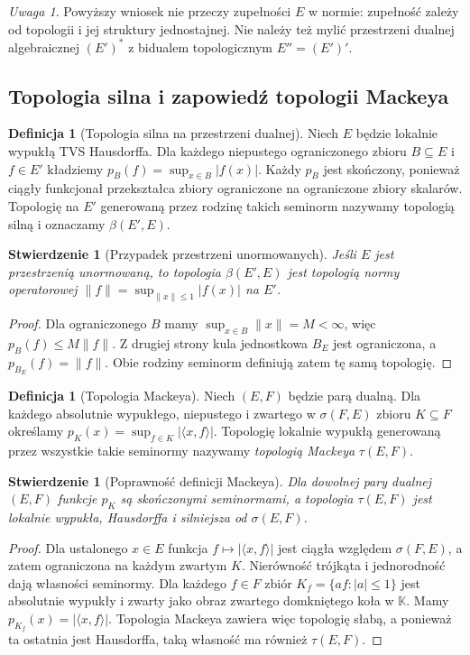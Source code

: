 \documentclass[11pt,a4paper]{article}
\numberwithin{equation}{section}
\theoremstyle{plain}
\newtheorem{stwierdzenie}[twierdzenie]{Stwierdzenie}
\theoremstyle{definition}
\newtheorem{definicja}[twierdzenie]{Definicja}
\theoremstyle{remark}
\newtheorem{uwaga}[twierdzenie]{Uwaga}
\newcommand{\K}{\mathbb K}
\begin{document}
\begin{uwaga}
Powyższy wniosek nie przeczy zupełności $E$ w normie:
zupełność zależy od topologii i jej struktury jednostajnej.
Nie należy też mylić przestrzeni dualnej algebraicznej
$(E')^*$ z bidualem topologicznym $E''=(E')'$.
\end{uwaga}

\subsection{Topologia silna i zapowiedź topologii Mackeya}

\begin{definicja}[Topologia silna na przestrzeni dualnej]
\label{def:silna-dualna}
Niech $E$ będzie lokalnie wypukłą TVS Hausdorffa.
Dla każdego niepustego ograniczonego zbioru $B\subseteq E$ i $f\in E'$
kładziemy $p_B(f)=\sup_{x\in B}|f(x)|$.
Każdy $p_B$ jest skończony, ponieważ ciągły funkcjonał
przekształca zbiory ograniczone na ograniczone zbiory skalarów.
Topologię na $E'$ generowaną przez rodzinę takich seminorm
nazywamy topologią silną i oznaczamy $\beta(E',E)$.
\end{definicja}
\begin{stwierdzenie}[Przypadek przestrzeni unormowanych]
\label{prop:silna-unormowana}
Jeśli $E$ jest przestrzenią unormowaną, to topologia
$\beta(E',E)$ jest topologią normy operatorowej
$\|f\|=\sup_{\|x\|\le1}|f(x)|$ na $E'$.
\end{stwierdzenie}
\begin{proof}
Dla ograniczonego $B$ mamy
$\sup_{x\in B}\|x\|=M<\infty$, więc
$p_B(f)\le M\|f\|$. Z drugiej strony kula jednostkowa
$B_E$ jest ograniczona, a $p_{B_E}(f)=\|f\|$.
Obie rodziny seminorm definiują zatem tę samą topologię.
\end{proof}

\begin{definicja}[Topologia Mackeya]\label{def:mackey}
Niech $(E,F)$ będzie parą dualną. Dla każdego absolutnie
wypukłego, niepustego i zwartego w $\sigma(F,E)$ zbioru $K\subseteq F$
określamy $p_K(x)=\sup_{f\in K}|\langle x,f\rangle|$.
Topologię lokalnie wypukłą generowaną przez wszystkie takie
seminormy nazywamy \emph{topologią Mackeya} $\tau(E,F)$.
\end{definicja}

\begin{stwierdzenie}[Poprawność definicji Mackeya]\label{prop:mackey-basic}
Dla dowolnej pary dualnej $(E,F)$ funkcje $p_K$ są
skończonymi seminormami, a topologia $\tau(E,F)$
jest lokalnie wypukła, Hausdorffa i silniejsza od
$\sigma(E,F)$.
\end{stwierdzenie}
\begin{proof}
Dla ustalonego $x\in E$ funkcja
$f\mapsto|\langle x,f\rangle|$ jest ciągła względem
$\sigma(F,E)$, a zatem ograniczona na każdym zwartym $K$.
Nierówność trójkąta i jednorodność dają własności seminormy.
Dla każdego $f\in F$ zbiór
$K_f=\{af:|a|\le1\}$ jest absolutnie wypukły i zwarty
jako obraz zwartego domkniętego koła w $\K$.
Mamy $p_{K_f}(x)=|\langle x,f\rangle|$.
Topologia Mackeya zawiera więc topologię słabą,
a ponieważ ta ostatnia jest Hausdorffa, taką własność
ma również $\tau(E,F)$.
\end{proof}
\end{document}
